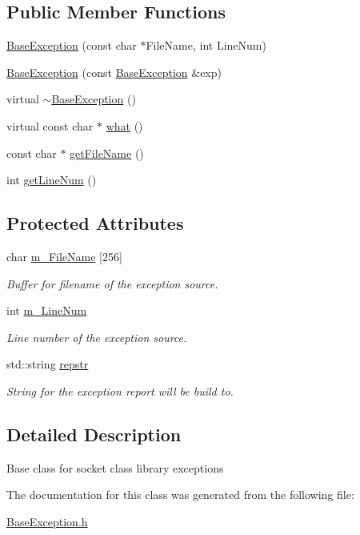 \subsection*{Public Member Functions}
\begin{DoxyCompactItemize}
\item 
\hyperlink{group__EXCEPT__GROUP_ga50ebb96feb32366ffc4e992ae5b95e31}{Base\+Exception} (const char $\ast$File\+Name, int Line\+Num)
\item 
\hyperlink{group__EXCEPT__GROUP_ga7b53cdc179f7919010bd7e22c32081e7}{Base\+Exception} (const \hyperlink{classBaseException}{Base\+Exception} \&exp)
\item 
virtual \hyperlink{group__EXCEPT__GROUP_gabc351b149be47d3e078dc04b9b5c8891}{$\sim$\+Base\+Exception} ()
\item 
virtual const char $\ast$ \hyperlink{group__EXCEPT__GROUP_gaf092dd6587491cd7a8cdd987597b1018}{what} ()
\item 
const char $\ast$ \hyperlink{group__EXCEPT__GROUP_gaeea140646898fbe7642cd2dc13b2b22c}{get\+File\+Name} ()
\item 
int \hyperlink{group__EXCEPT__GROUP_ga70bef940bbfd7bb2cc50b8150e1bded2}{get\+Line\+Num} ()
\end{DoxyCompactItemize}
\subsection*{Protected Attributes}
\begin{DoxyCompactItemize}
\item 
char \hyperlink{group__EXCEPT__GROUP_gab2b4ea653318d8effd1d4d6d3cdc53d2}{m\+\_\+\+File\+Name} \mbox{[}256\mbox{]}
\begin{DoxyCompactList}\small\item\em Buffer for filename of the exception source. \end{DoxyCompactList}\item 
int \hyperlink{group__EXCEPT__GROUP_ga40bdabd0e0187fc6738ce0c44564da99}{m\+\_\+\+Line\+Num}
\begin{DoxyCompactList}\small\item\em Line number of the exception source. \end{DoxyCompactList}\item 
std\+::string \hyperlink{group__EXCEPT__GROUP_gad3dcd3ea212b160842c33b62955c4ff9}{repstr}
\begin{DoxyCompactList}\small\item\em String for the exception report will be build to. \end{DoxyCompactList}\end{DoxyCompactItemize}


\subsection{Detailed Description}
Base class for socket class library exceptions 

The documentation for this class was generated from the following file\+:\begin{DoxyCompactItemize}
\item 
\hyperlink{BaseException_8h}{Base\+Exception.\+h}\end{DoxyCompactItemize}
